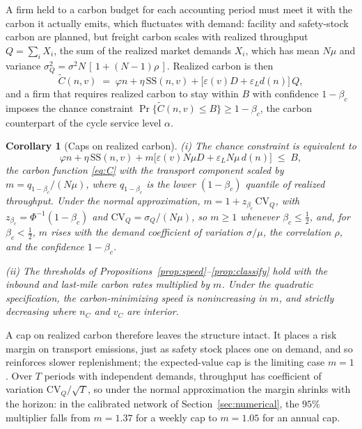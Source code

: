 \documentclass[11pt]{article}
\numberwithin{proposition}{section}
\newtheorem{corollary}[proposition]{Corollary}
\theoremstyle{definition}
\theoremstyle{remark}
\theoremstyle{plain}
\newcommand{\sstock}{\mathrm{SS}}
\begin{document}
A firm held to a carbon budget for each accounting period must meet it with the carbon it actually emits, which
fluctuates with demand: facility and safety-stock carbon are planned, but freight carbon scales with realized
throughput $Q=\sum_i X_i$, the sum of the realized market demands $X_i$, which has mean $N\mu$ and variance $\sigma_Q^2=\sigma^2 N\,[\,1+(N-1)\rho\,]$. Realized carbon is then
\begin{equation}\label{eq:Ctilde}
  \tilde C(n,v) \;=\; \varphi n + \eta\,\sstock(n,v) + \big[\varepsilon(v)D+\varepsilon_L d(n)\big]\,Q,
\end{equation}
and a firm that requires realized carbon to stay within $B$ with confidence $1-\beta_c$ imposes the chance
constraint $\Pr\{\tilde C(n,v)\le B\}\ge 1-\beta_c$, the carbon counterpart of the cycle service level $\alpha$.

\begin{corollary}[Caps on realized carbon]\label{prop:chance}
\textup{(i)} The chance constraint is equivalent to
\begin{equation}\label{eq:chancecap}
  \varphi n + \eta\,\sstock(n,v) + m\big[\varepsilon(v)N\mu D+\varepsilon_L N\mu\, d(n)\big]\;\le\;B,
\end{equation}
the carbon function \eqref{eq:C} with the transport component scaled by $m=q_{1-\beta_c}/(N\mu)$, where
$q_{1-\beta_c}$ is the lower $(1-\beta_c)$ quantile of realized throughput. Under the normal approximation,
$m=1+z_{\beta_c}\,\mathrm{CV}_Q$, with $z_{\beta_c}=\Phi^{-1}(1-\beta_c)$ and $\mathrm{CV}_Q=\sigma_Q/(N\mu)$, so
$m\ge1$ whenever $\beta_c\le\tfrac12$, and, for $\beta_c<\tfrac12$, $m$ rises with the demand coefficient of
variation $\sigma/\mu$, the correlation $\rho$, and the confidence $1-\beta_c$.

\smallskip\noindent\textup{(ii)} The thresholds of Propositions~\ref{prop:speed}--\ref{prop:classify} hold with
the inbound and last-mile carbon rates multiplied by $m$. Under the quadratic specification, the
carbon-minimizing speed is nonincreasing in $m$, and strictly decreasing where $n_C$ and $v_C$ are interior.
\end{corollary}

\noindent A cap on realized carbon therefore leaves the structure intact. It places a risk margin on transport
emissions, just as safety stock places one on demand, and so reinforces slower replenishment; the expected-value cap is the limiting case $m=1$. Over $T$ periods with independent demands, throughput has coefficient of variation
$\mathrm{CV}_Q/\sqrt{T}$, so under the normal approximation the margin shrinks with the horizon: in the calibrated network of
Section~\ref{sec:numerical}, the $95\%$ multiplier falls from $m=1.37$ for a weekly cap to $m=1.05$ for an annual
cap.
\end{document}
